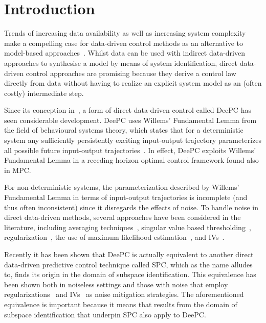 \section{Introduction}
Trends of increasing data availability as well as increasing system complexity make a compelling case for data-driven control methods as an alternative to model-based approaches~\cite{Hou2013}. Whilst data can be used with indirect data-driven approaches to synthesise a model by means of system identification, direct data-driven control approaches are promising because they derive a control law directly from data without having to realize an explicit system model as an (often costly) intermediate step.

Since its conception in~\cite{Coulson2019}, a form of direct data-driven control called \ac{DeePC} has seen considerable development. \ac{DeePC} uses Willems' Fundamental Lemma from the field of behavioural systems theory, which states that for a deterministic system any sufficiently persistently exciting input-output trajectory parameterizes all possible future input-output trajectories~\cite{Willems2005}. In effect, \ac{DeePC} exploits Willems' Fundamental Lemma in a receding horizon optimal control framework found also in \ac{MPC}.

For non-deterministic systems, the parameterization described by Willems' Fundamental Lemma in terms of input-output trajectories is incomplete (and thus often inconsistent) since it disregards the effects of noise. To handle noise in direct data-driven methods, several approaches have been considered in the literature, including averaging techniques~\cite{Jo2022}, singular value based thresholding~\cite{Sassella2022}, regularization~\cite{Coulson2019}, the use of maximum likelihood estimation~\cite{Yin2023}, and \ac{IVs}~\cite{vanWingerden2022}.

Recently it has been shown that \ac{DeePC} is actually equivalent to another direct data-driven predictive control technique called \ac{SPC}, which as the name alludes to, finds its origin in the domain of subspace identification. This equivalence has been shown both in noiseless settings and those with noise that employ regularizations~\cite{Fiedler2021} and \ac{IVs}~\cite{vanWingerden2022} as noise mitigation strategies. The aforementioned equivalence is important because it means that results from the domain of subspace identification that underpin \ac{SPC} also apply to \ac{DeePC}.

